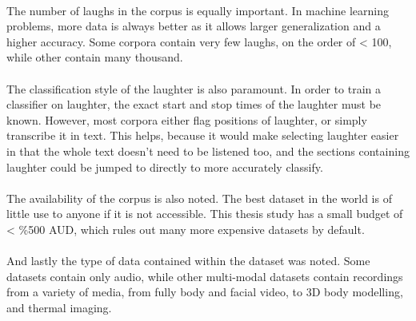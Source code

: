 \documentclass[a4paper,11pt,notitlepage]{article}
\begin{document}
\\
The number of laughs in the corpus is equally important. In machine learning problems, more data is always better as it allows larger generalization and a higher accuracy. Some corpora contain very few laughs, on the order of < 100, while other contain many thousand.\\
\\
The classification style of the laughter is also paramount. In order to train a classifier on laughter, the exact start and stop times of the laughter must be known. However, most corpora either flag positions of laughter, or simply transcribe it in text. This helps, because it would make selecting laughter easier in that the whole text doesn't need to be listened too, and the sections containing laughter could be jumped to directly to more accurately classify.\\
\\
The availability of the corpus is also noted. The best dataset in the world is of little use to anyone if it is not accessible. This thesis study has a small budget of < \%500 AUD, which rules out many more expensive datasets by default.\\
\\
And lastly the type of data contained within the dataset was noted. Some datasets contain only audio, while other multi-modal datasets contain recordings from a variety of media, from fully body and facial video, to 3D body modelling, and thermal imaging.
\end{document}
